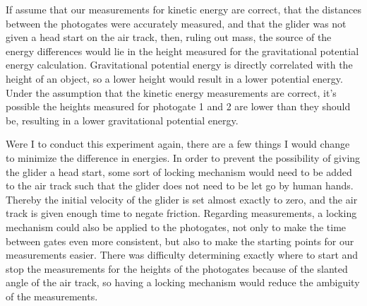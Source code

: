 If assume that our measurements for kinetic energy are correct, that the distances between the photogates were accurately measured, and that the glider was not given a head start on the air track, then, ruling out mass, the source of the energy differences would lie in the height measured for the gravitational potential energy calculation. Gravitational potential energy is directly correlated with the height of an object, so a lower height would result in a lower potential energy. Under the assumption that the kinetic energy measurements are correct, it's possible the heights measured for photogate 1 and 2 are lower than they should be, resulting in a lower gravitational potential energy.

Were I to conduct this experiment again, there are a few things I would change to minimize the difference in energies. In order to prevent the possibility of giving the glider a head start, some sort of locking mechanism would need to be added to the air track such that the glider does not need to be let go by human hands. Thereby the initial velocity of the glider is set almost exactly to zero, and the air track is given enough time to negate friction. Regarding measurements, a locking mechanism could also be applied to the photogates, not only to make the time between gates even more consistent, but also to make the starting points for our measurements easier. There was difficulty determining exactly where to start and stop the measurements for the heights of the photogates because of the slanted angle of the air track, so having a locking mechanism would reduce the ambiguity of the measurements. 

